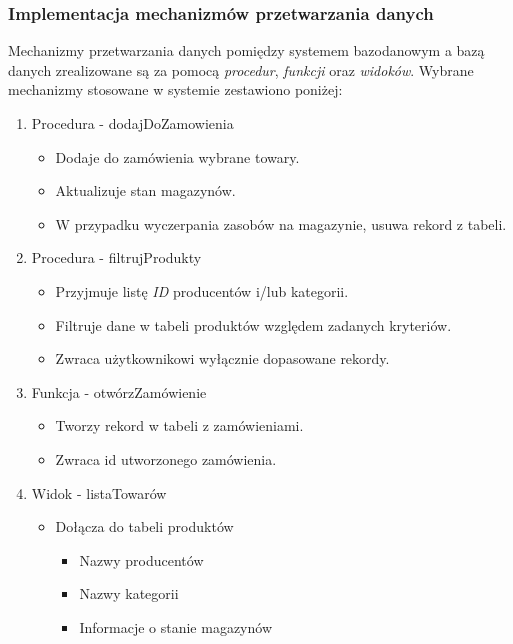 \documentclass[a4paper, 12pt]{article}
\newcommand{\snippet}[3]{



}
\begin{document}
\snippet{SQL}{triggery.sql}{Przykładowy wyzwalacz}

\subsubsection{Implementacja mechanizmów przetwarzania danych}
Mechanizmy przetwarzania danych pomiędzy systemem bazodanowym a bazą danych zrealizowane są za pomocą \textit{procedur}, \textit{funkcji} oraz \textit{widoków}. Wybrane mechanizmy stosowane w systemie zestawiono poniżej:

\begin{enumerate}
\item Procedura - dodajDoZamowienia
\begin{itemize}
\item Dodaje do zamówienia wybrane towary.
\item Aktualizuje stan magazynów.
\item W przypadku wyczerpania zasobów na magazynie, usuwa rekord z tabeli.

\snippet{SQL}{procedura.sql}{Przykładowa procedura}

\end{itemize}
\item Procedura - filtrujProdukty
\begin{itemize}
\item Przyjmuje listę \textit{ID} producentów i/lub kategorii.
\item Filtruje dane w tabeli produktów względem zadanych kryteriów.
\item Zwraca użytkownikowi wyłącznie dopasowane rekordy.
\end{itemize}
\item Funkcja - otwórzZamówienie
\begin{itemize}
\item Tworzy rekord w tabeli z zamówieniami.
\item Zwraca id utworzonego zamówienia.

\snippet{SQL}{funkcja.sql}{Przykładowa funkcja}

\end{itemize}
\item Widok - listaTowarów
\begin{itemize}
\item Dołącza do tabeli produktów
\begin{itemize}
\item Nazwy producentów
\item Nazwy kategorii
\item Informacje o stanie magazynów
\end{itemize}
\end{itemize}
\end{enumerate}
\end{document}
